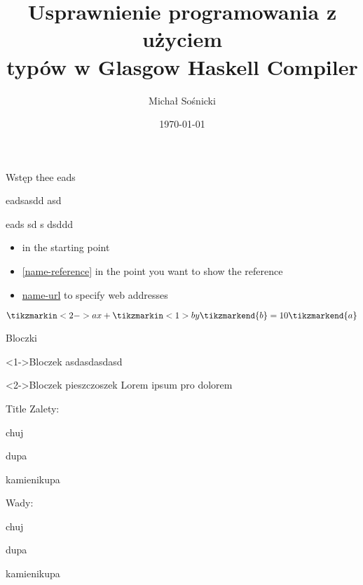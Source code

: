 \documentclass[polish]{beamer}
\author{Michał Sośnicki}
\title[Praca inżynierska]{Usprawnienie programowania z użyciem\\ typów w Glasgow Haskell Compiler}
\date{\today}
\begin{document}
\titlepageframe

\begin{tframe}{Wstęp}
\alert{thee} eads

 eadsasdd asd

 eads sd s dsddd

\begin{itemize}
    \item \label{name-reference} in the starting point
    \item \ref{name-reference} in the point you want to show the reference
    \item \href{url}{name-url} to specify web addresses
\end{itemize}

\[\tikzmarkin<2->{a}x+
\tikzmarkin<1>{b}y\tikzmarkend{b}
=10\tikzmarkend{a}\]
\end{tframe}

\begin{tframe}{Bloczki}
\begin{block}
<1->{Bloczek}
asdasdasdasd
\end{block}
\begin{block}
<2->{Bloczek pieszczoszek}
Lorem ipsum pro dolorem
\end{block}
\end{tframe}


\begin{tframe}{Title}
Zalety:
\begin{adv}
	\item chuj
	\item dupa
	\item kamienikupa
\end{adv}
Wady:
\begin{disadv}
	\item chuj
	\item dupa
	\item kamienikupa
\end{disadv}
\end{tframe}
\end{document}
